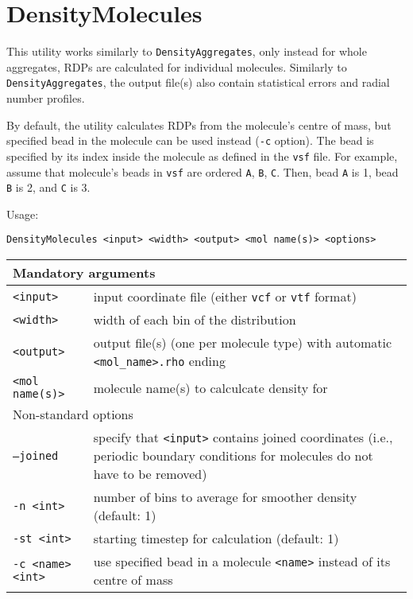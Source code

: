 \section{DensityMolecules} \label{sec:DensityMolecules}

This utility works similarly to \texttt{DensityAggregates}, only instead
for whole aggregates, RDPs are calculated for individual molecules.
Similarly to \texttt{DensityAggregates}, the output file(s) also contain
statistical errors and radial number profiles.

By default, the utility calculates RDPs from the molecule's centre of mass,
but specified bead in the molecule can be used instead (\texttt{-c}
option). The bead is specified by its index inside the molecule as defined
in the \texttt{vsf} file. For example, assume that molecule's beads in
\texttt{vsf} are ordered \texttt{A}, \texttt{B}, \texttt{C}. Then, bead
\texttt{A} is 1, bead \texttt{B} is 2, and \texttt{C} is 3.

Usage:

\vspace{1em}
\noindent
\texttt{DensityMolecules <input> <width> <output> <mol name(s)> <options>}

\noindent
\begin{longtable}{p{}p{}}
  \toprule
  \multicolumn{2}{l}{Mandatory arguments} \\
  \midrule
  \texttt{<input>} & input coordinate file (either \texttt{vcf} or
    \texttt{vtf} format) \\
  \texttt{<width>} & width of each bin of the distribution \\
  \texttt{<output>} & output file(s) (one per molecule type) with
    automatic \texttt{<mol\_name>.rho} ending \\
  \texttt{<mol name(s)>} & molecule name(s) to calculcate density for \\
  \toprule
  \multicolumn{2}{l}{Non-standard options} \\
  \midrule
  \texttt{--joined} & specify that \texttt{<input>} contains joined
    coordinates (i.e., periodic boundary conditions for molecules do not
    have to be removed) \\
  \texttt{-n <int>} & number of bins to average for smoother density
    (default: 1) \\
  \texttt{-st <int>} & starting timestep for calculation (default: 1) \\
  \texttt{-c <name> <int>} & use specified bead in a molecule
    \texttt{<name>} instead of its centre of mass \\
  \bottomrule
\end{longtable}

